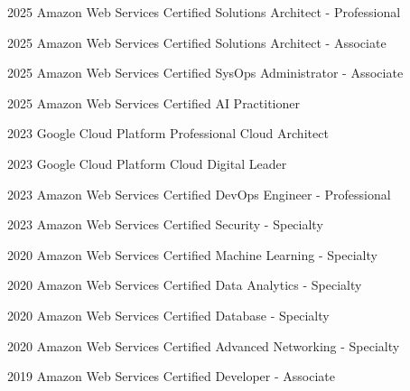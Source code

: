 \education
  {2025}
  {Amazon Web Services}
  {Certified Solutions Architect - Professional}

\education
  {2025}
  {Amazon Web Services}
  {Certified Solutions Architect - Associate}

\education
  {2025}
  {Amazon Web Services}
  {Certified SysOps Administrator - Associate}

\education
  {2025}
  {Amazon Web Services}
  {Certified AI Practitioner}

\education
  {2023}
  {Google Cloud Platform}
  {Professional Cloud Architect}

\education
  {2023}
  {Google Cloud Platform}
  {Cloud Digital Leader}

\education
  {2023}
  {Amazon Web Services}
  {Certified DevOps Engineer - Professional}

\education
  {2023}
  {Amazon Web Services}
  {Certified Security - Specialty}

\education
  {2020}
  {Amazon Web Services}
  {Certified Machine Learning - Specialty}

\education
  {2020}
  {Amazon Web Services}
  {Certified Data Analytics - Specialty}

\education
  {2020}
  {Amazon Web Services}
  {Certified Database - Specialty}

\education
  {2020}
  {Amazon Web Services}
  {Certified Advanced Networking - Specialty}

\education
  {2019}
  {Amazon Web Services}
  {Certified Developer - Associate}

